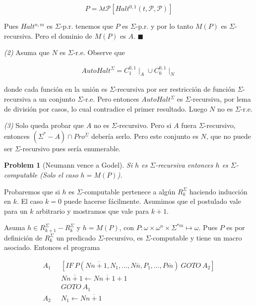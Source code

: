 \documentclass[a4paper, 12pt]{article}
\newtheorem{problem}{Problem}
\newtheorem{problem}{Problem}
\begin{document}
$$P = \lambda t\mathcal{P} \left[ Halt^{0, 1}(t,
\mathcal{P}, \mathcal{P})  \right]$$

Pues $Halt^{n, m}$ es $\Sigma$-p.r. tenemos que $P$ es $\Sigma$-p.r. y por lo
tanto $M(P)$ es $\Sigma$-recursiva. Pero el dominio de $M(P)$ es $A$. $\blacksquare$

\textit{(2)} Asuma que $N$ es $\Sigma$-r.e. Observe que 

\begin{align*}
    AutoHalt^{\Sigma} = C_1^{0, 1} \mid_A \cup C_0^{0, 1} \mid_N
\end{align*}

donde cada función en la unión es $\Sigma$-recursiva por ser restricción de
función $\Sigma$-recursiva a un conjunto $\Sigma$-r.e. Pero entonces
$AutoHalt^{\Sigma}$ es $\Sigma$-recursiva, por lema de división por casos, lo
cual contradice el primer resultado. Luego $N$  no es $\Sigma$-r.e.

\textit{(3)} Solo queda probar que $A$ no es $\Sigma$-recursivo. Pero si $A$
fuera $\Sigma$-recursivo, entonces $(\Sigma^{*} - A) \cap Pro^{\Sigma}$ debería
serlo. Pero este conjunto es $N$, que no puede ser $\Sigma$-recursivo pues
sería enumerable.

\begin{problem}[Neumann vence a Godel]
    Si $h$ es $\Sigma$-recursiva entonces $h$ es $\Sigma$-computable (Solo el
    caso $h = M(P)$).
\end{problem}

Probaremos que si $h$ es $\Sigma$-computable pertenece a algún $R_k^{\Sigma}$
haciendo inducción en $k$. El caso $k = 0$ puede hacerse fácilmente. Asumimos
que el postulado vale para un $k$ arbitrario y mostramos que vale para $k + 1$. 

Asuma $h \in R_{k+1}^{\Sigma} - R_{k}^{\Sigma}$ y $h = M(P)$, con $P : \omega
\times \omega^{n} \times \Sigma^{*m} \mapsto \omega$. Pues $P$ es por
definición de $R_k^{\Sigma}$ un predicado $\Sigma$-recursivo, es
$\Sigma$-computable y tiene un macro asociado. Entonces el programa 

\begin{align*}
    A_1 &[IF ~ P(N\overline{n + 1}, N_1, \ldots, N \overline{n}, P_1, \ldots,
    P\overline{m}) ~ GOTO ~ A_2] \\ 
        &N\overline{n+1} \leftarrow  N\overline{n+1} + 1 \\ 
        &GOTO ~ A_1 \\ 
    A_2 ~ ~ ~ & N_1 \leftarrow N\overline{n + 1}
\end{align*}
\end{document}
